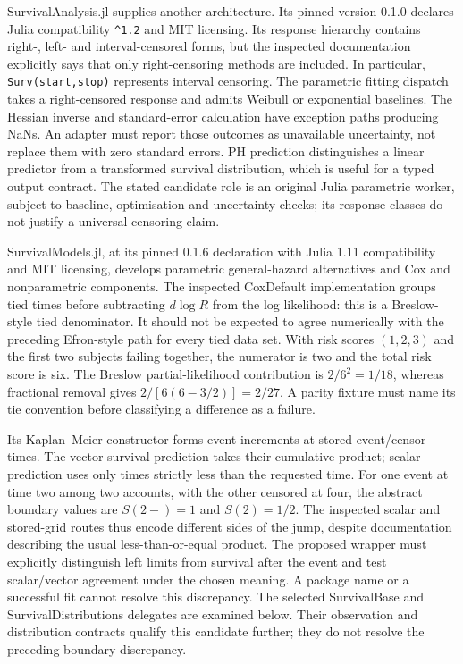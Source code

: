 SurvivalAnalysis.jl supplies another architecture. Its pinned version 0.1.0 declares
Julia compatibility \texttt{\^{}1.2} and MIT licensing. Its response hierarchy contains
right-, left- and interval-censored forms, but the inspected documentation explicitly
says that only right-censoring methods are included. In particular,
\texttt{Surv(start,stop)} represents interval censoring. The parametric fitting
dispatch takes a right-censored response and admits Weibull or exponential baselines.
The Hessian inverse and standard-error calculation have exception paths producing
NaNs. An adapter must report those outcomes as unavailable uncertainty, not replace
them with zero standard errors. PH prediction distinguishes a linear predictor from
a transformed survival distribution, which is useful for a typed output contract.
The stated candidate role is an original Julia parametric worker, subject to baseline,
optimisation and uncertainty checks; its response classes do not justify a universal
censoring claim.~\citep{exec24_survivalother_juliaanalysis}

SurvivalModels.jl, at its pinned 0.1.6 declaration with Julia 1.11 compatibility and
MIT licensing, develops parametric general-hazard alternatives and Cox and
nonparametric components. The inspected CoxDefault implementation groups tied times
before subtracting $d\log R$ from the log likelihood: this is a Breslow-style tied
denominator. It should not be expected to agree numerically with the preceding
Efron-style path for every tied data set. With risk scores $(1,2,3)$ and the first
two subjects failing together, the numerator is two and the total risk score is six.
The Breslow partial-likelihood contribution is $2/6^2=1/18$, whereas fractional
removal gives $2/[6(6-3/2)]=2/27$. A parity fixture must name its tie convention
before classifying a difference as a failure.~\citep{exec24_survivalother_juliamodels,exec24_survivalother_reference}

Its Kaplan--Meier constructor forms event increments at stored event/censor times.
The vector survival prediction takes their cumulative product; scalar prediction
uses only times strictly less than the requested time. For one event at time two
among two accounts, with the other censored at four, the abstract boundary values
are $S(2-)=1$ and $S(2)=1/2$. The inspected scalar and stored-grid routes thus encode
different sides of the jump, despite documentation describing the usual less-than-or-equal
product. The proposed wrapper must explicitly distinguish left limits from survival
after the event and test scalar/vector agreement under the chosen meaning. A package
name or a successful fit cannot resolve this discrepancy. The selected SurvivalBase and SurvivalDistributions delegates are examined
below. Their observation and distribution contracts qualify this candidate
further; they do not resolve the preceding boundary discrepancy.
\citep{exec24_survivalother_juliamodels,exec24_survivalother_reference}

